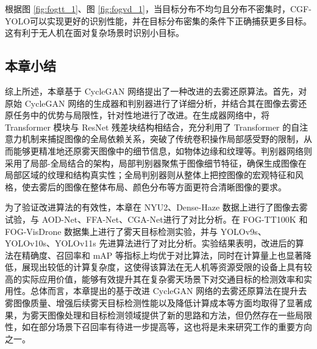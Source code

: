 根据图 \ref{fig:fogtt_1}、图 \ref{fig:fogvd_1}，当目标分布不均匀且分布不密集时，CGF-YOLO可以实现更好的识别性能，并在目标分布密集的条件下正确捕获更多目标。这有利于无人机在面对复杂场景时识别小目标。

\subsection{本章小结}

综上所述，本章基于 CycleGAN 网络提出了一种改进的去雾还原算法。首先，对原始 CycleGAN 网络的生成器和判别器进行了详细分析，并结合其在图像去雾还原任务中的优势与局限性，针对性地进行了改进。在生成器网络中，将 Transformer 模块与 ResNet 残差块结构相结合，充分利用了 Transformer 的自注意力机制来捕捉图像的全局依赖关系，突破了传统卷积操作局部感受野的限制，从而能够更精准地还原雾天图像中的细节信息，如物体边缘和纹理等。判别器网络则采用了局部-全局结合的架构，局部判别器聚焦于图像细节特征，确保生成图像在局部区域的纹理和结构真实性；全局判别器则从整体上把控图像的宏观特征和风格，使去雾后的图像在整体布局、颜色分布等方面更符合清晰图像的要求。

为了验证改进算法的有效性，本章在 NYU2、Dense-Haze 数据上进行了图像去雾试验，与 AOD-Net、FFA-Net、CGA-Net进行了对比分析。在 FOG-TT100K 和 FOG-VisDrone 数据集上进行了雾天目标检测实验，并与 YOLOv9s、YOLOv10s、YOLOv11s 先进算法进行了对比分析。实验结果表明，改进后的算法在精确度、召回率和 mAP 等指标上均优于对比算法，同时在计算量上也显著降低，展现出较低的计算复杂度，这使得该算法在无人机等资源受限的设备上具有较高的实际应用价值，能够有效提升其在复杂雾天场景下对交通目标的检测效率和实用性。总体而言，本章提出的基于改进 CycleGAN 网络的去雾还原算法在提升去雾图像质量、增强后续雾天目标检测性能以及降低计算成本等方面均取得了显著成果，为雾天图像处理和目标检测领域提供了新的思路和方法，但仍然存在一些局限性，如在部分场景下召回率有待进一步提高等，这也将是未来研究工作的重要方向之一。
